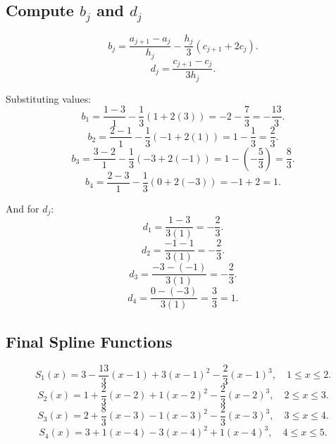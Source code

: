\documentclass[12pt]{article}
\begin{document}
\begin{enumerate}[leftmargin=2em]
\subsection*{Compute \( b_j \) and \( d_j \)}

\[
b_j = \frac{a_{j+1} - a_j}{h_j} - \frac{h_j}{3}(c_{j+1} + 2c_j).
\]
\[
d_j = \frac{c_{j+1} - c_j}{3h_j}.
\]

Substituting values:
\[
b_1 = \frac{1 - 3}{1} - \frac{1}{3}(1 + 2(3)) = -2 - \frac{7}{3} = -\frac{13}{3}.
\]
\[
b_2 = \frac{2 - 1}{1} - \frac{1}{3}(-1 + 2(1)) = 1 - \frac{1}{3} = \frac{2}{3}.
\]
\[
b_3 = \frac{3 - 2}{1} - \frac{1}{3}(-3 + 2(-1)) = 1 - \left(-\frac{5}{3}\right) = \frac{8}{3}.
\]
\[
b_4 = \frac{2 - 3}{1} - \frac{1}{3}(0 + 2(-3)) = -1 + 2 = 1.
\]

And for \( d_j \):
\[
d_1 = \frac{1 - 3}{3(1)} = -\frac{2}{3}.
\]
\[
d_2 = \frac{-1 - 1}{3(1)} = -\frac{2}{3}.
\]
\[
d_3 = \frac{-3 - (-1)}{3(1)} = -\frac{2}{3}.
\]
\[
d_4 = \frac{0 - (-3)}{3(1)} = \frac{3}{3} = 1.
\]

\subsection*{Final Spline Functions}

\[
S_1(x) = 3 - \frac{13}{3}(x - 1) + 3(x - 1)^2 - \frac{2}{3}(x - 1)^3, \quad 1 \leq x \leq 2.
\]
\[
S_2(x) = 1 + \frac{2}{3}(x - 2) + 1(x - 2)^2 - \frac{2}{3}(x - 2)^3, \quad 2 \leq x \leq 3.
\]
\[
S_3(x) = 2 + \frac{8}{3}(x - 3) - 1(x - 3)^2 - \frac{2}{3}(x - 3)^3, \quad 3 \leq x \leq 4.
\]
\[
S_4(x) = 3 + 1(x - 4) - 3(x - 4)^2 + 1(x - 4)^3, \quad 4 \leq x \leq 5.
\]


\end{enumerate}
\end{document}
